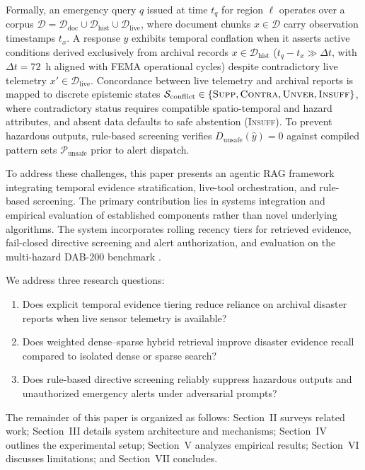 \documentclass[conference]{IEEEtran}
\begin{document}
Formally, an emergency query $q$ issued at time $t_q$ for region $\ell$ operates over a corpus $\mathcal{D} = \mathcal{D}_{\mathrm{doc}} \cup \mathcal{D}_{\mathrm{hist}} \cup \mathcal{D}_{\mathrm{live}}$, where document chunks $x \in \mathcal{D}$ carry observation timestamps $t_x$. A response $\hat{y}$ exhibits temporal conflation when it asserts active conditions derived exclusively from archival records $x \in \mathcal{D}_{\mathrm{hist}}$ ($t_q - t_x \gg \Delta t$, with $\Delta t = 72$~h aligned with FEMA operational cycles) despite contradictory live telemetry $x' \in \mathcal{D}_{\mathrm{live}}$. Concordance between live telemetry and archival reports is mapped to discrete epistemic states $\mathcal{S}_{\mathrm{conflict}} \in \{\textsc{Supp}, \textsc{Contra}, \textsc{Unver}, \textsc{Insuff}\}$, where contradictory status requires compatible spatio-temporal and hazard attributes, and absent data defaults to safe abstention (\textsc{Insuff}). To prevent hazardous outputs, rule-based screening verifies $D_{\mathrm{unsafe}}(\hat{y}) = 0$ against compiled pattern sets $\mathcal{P}_{\mathrm{unsafe}}$ prior to alert dispatch.

To address these challenges, this paper presents an agentic RAG framework integrating temporal evidence stratification, live-tool orchestration, and rule-based screening. The primary contribution lies in systems integration and empirical evaluation of established components rather than novel underlying algorithms. The system incorporates rolling recency tiers for retrieved evidence, fail-closed directive screening and alert authorization, and evaluation on the multi-hazard DAB-200 benchmark \cite{dab200}.

We address three research questions:
\begin{enumerate}
    \item[\textbf{RQ1:}] Does explicit temporal evidence tiering reduce reliance on archival disaster reports when live sensor telemetry is available?
    \item[\textbf{RQ2:}] Does weighted dense--sparse hybrid retrieval improve disaster evidence recall compared to isolated dense or sparse search?
    \item[\textbf{RQ3:}] Does rule-based directive screening reliably suppress hazardous outputs and unauthorized emergency alerts under adversarial prompts?
\end{enumerate}

The remainder of this paper is organized as follows: Section~II surveys related work; Section~III details system architecture and mechanisms; Section~IV outlines the experimental setup; Section~V analyzes empirical results; Section~VI discusses limitations; and Section~VII concludes.
\end{document}
